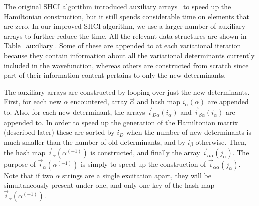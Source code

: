 \documentclass[%
preprint,
 superscriptaddress,
 amsmath,amssymb,
 aps,
]{revtex4-1}
\def\veca{\vec{\alpha}}
\def\vecb{\vec{\beta}}
\def\ia{i_\alpha}
\def\ib{i_\beta}
\def\vecia{\vec{i}_\alpha}
\def\veciDa{\vec{i}_{D\alpha}}
\def\veciaa{\vec{i}_{\alpha\alpha}}
\def\veciba{\vec{i}_{\beta\alpha}}
\begin{document}
The original SHCI algorithm introduced
auxiliary arrays~\cite{ShaHolJeaAlaUmr-JCTC-17} to speed up the Hamiltonian construction,
but it still spends considerable time on elements that are zero.
In our improved SHCI algorithm, we use a larger number of auxiliary arrays to further reduce the time.
All the relevant data structures are shown in Table~\ref{auxiliary}.
Some of these are appended to at each variational iteration because they contain information about all the variational determinants
currently included in the wavefunction, whereas others are constructed from scratch since part of their information content
pertains to only the new determinants.

The auxiliary arrays are constructed by looping over just the new determinants.
First, for each new $\alpha$ encountered, array $\veca$ and hash map $\ia(\alpha)$ are appended to.
Also, for each new determinant, the arrays $\veciDa(\ia)$ and $\veciba(\ia)$ are appended to.
In order to speed up the generation of the Hamiltonian matrix (described later) these
are sorted by $i_D$ when the number of new determinants is much smaller than the number of old determinants,
and by $\ib$
otherwise.
Then, the hash map $\vecia(\alpha^{(-1)})$ is constructed, and finally the array $\veciaa(j_\alpha)$.
The purpose of $\vecia(\alpha^{(-1)})$ is simply to speed up the construction of $\veciaa(j_\alpha)$.
Note that if two $\alpha$ strings are a single excitation apart, they will be simultaneously present under one, and only one key of the hash map $\vecia(\alpha^{(-1)})$.
\end{document}
